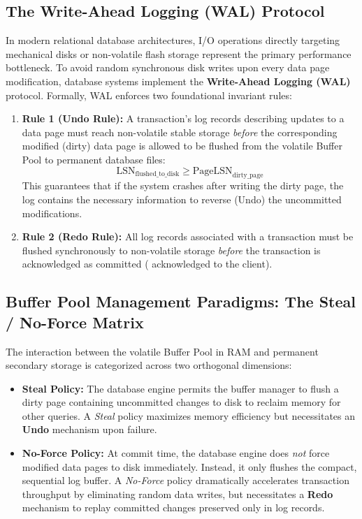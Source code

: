 \subsection{The Write-Ahead Logging (WAL) Protocol}
In modern relational database architectures, I/O operations directly targeting mechanical disks or non-volatile flash storage represent the primary performance bottleneck. To avoid random synchronous disk writes upon every data page modification, database systems implement the \textbf{Write-Ahead Logging (WAL)} protocol. Formally, WAL enforces two foundational invariant rules:
\begin{enumerate}
    \item \textbf{Rule 1 (Undo Rule):} A transaction's log records describing updates to a data page must reach non-volatile stable storage \textit{before} the corresponding modified (dirty) data page is allowed to be flushed from the volatile Buffer Pool to permanent database files:
    \begin{equation}
        \mathrm{LSN}_{\mathrm{flushed\_to\_disk}} \ge \mathrm{PageLSN}_{\mathrm{dirty\_page}}
    \end{equation}
    This guarantees that if the system crashes after writing the dirty page, the log contains the necessary information to reverse (Undo) the uncommitted modifications.
    \item \textbf{Rule 2 (Redo Rule):} All log records associated with a transaction must be flushed synchronously to non-volatile storage \textit{before} the transaction is acknowledged as committed ( acknowledged to the client).
\end{enumerate}

\subsection{Buffer Pool Management Paradigms: The Steal / No-Force Matrix}
The interaction between the volatile Buffer Pool in RAM and permanent secondary storage is categorized across two orthogonal dimensions:
\begin{itemize}
    \item \textbf{Steal Policy:} The database engine permits the buffer manager to flush a dirty page containing uncommitted changes to disk to reclaim memory for other queries. A \textit{Steal} policy maximizes memory efficiency but necessitates an \textbf{Undo} mechanism upon failure.
    \item \textbf{No-Force Policy:} At commit time, the database engine does \textit{not} force modified data pages to disk immediately. Instead, it only flushes the compact, sequential log buffer. A \textit{No-Force} policy dramatically accelerates transaction throughput by eliminating random data writes, but necessitates a \textbf{Redo} mechanism to replay committed changes preserved only in log records.
\end{itemize}

